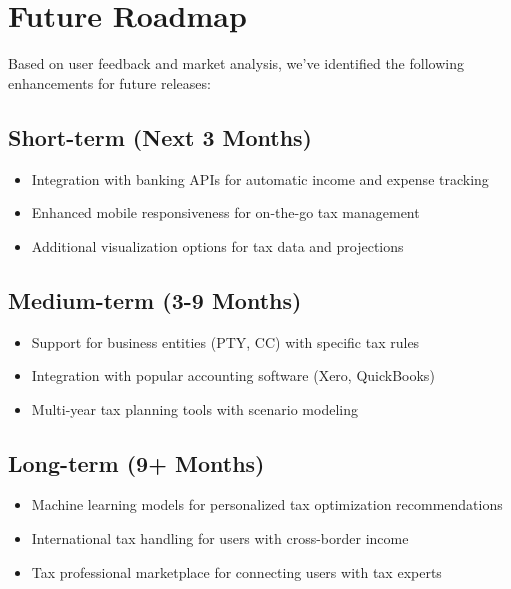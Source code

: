 \documentclass[
  11pt,
  letterpaper,
]{article}
\providecommand{\tightlist}{%
  \setlength{\itemsep}{0pt}\setlength{\parskip}{0pt}}\usepackage{longtable,booktabs,array}
\begin{document}
\hypertarget{future-roadmap}{%
\section{Future Roadmap}\label{future-roadmap}}

Based on user feedback and market analysis, we've identified the
following enhancements for future releases:

\hypertarget{short-term-next-3-months}{%
\subsection{Short-term (Next 3 Months)}\label{short-term-next-3-months}}

\begin{itemize}
\tightlist
\item
  Integration with banking APIs for automatic income and expense
  tracking
\item
  Enhanced mobile responsiveness for on-the-go tax management
\item
  Additional visualization options for tax data and projections
\end{itemize}

\hypertarget{medium-term-3-9-months}{%
\subsection{Medium-term (3-9 Months)}\label{medium-term-3-9-months}}

\begin{itemize}
\tightlist
\item
  Support for business entities (PTY, CC) with specific tax rules
\item
  Integration with popular accounting software (Xero, QuickBooks)
\item
  Multi-year tax planning tools with scenario modeling
\end{itemize}

\hypertarget{long-term-9-months}{%
\subsection{Long-term (9+ Months)}\label{long-term-9-months}}

\begin{itemize}
\tightlist
\item
  Machine learning models for personalized tax optimization
  recommendations
\item
  International tax handling for users with cross-border income
\item
  Tax professional marketplace for connecting users with tax experts
\end{itemize}
\end{document}

